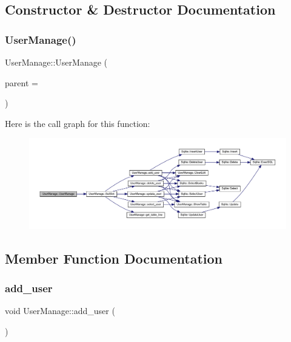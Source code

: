 \subsection{Constructor \& Destructor Documentation}
\mbox{\label{class_user_manage_ae341d2b1a3a87f0603a2788f37517c4a}} 
\subsubsection{\texorpdfstring{UserManage()}{UserManage()}}
{\footnotesize\ttfamily User\+Manage\+::\+User\+Manage (\begin{DoxyParamCaption}\item[{Q\+Widget $\ast$}]{parent = {} }\end{DoxyParamCaption})\hspace{0.3cm}{\ttfamily [explicit]}}

Here is the call graph for this function\+:
\nopagebreak
\begin{figure}[H]
\begin{center}
\leavevmode
\includegraphics[width=350pt]{class_user_manage_ae341d2b1a3a87f0603a2788f37517c4a_cgraph}
\end{center}
\end{figure}


\subsection{Member Function Documentation}
\mbox{\label{class_user_manage_a7058bbb981e4c6b3064c3e5e334ac700}} 
\subsubsection{\texorpdfstring{add\_user}{add\_user}}
{\footnotesize\ttfamily void User\+Manage\+::add\+\_\+user (\begin{DoxyParamCaption}{ }\end{DoxyParamCaption})\hspace{0.3cm}{\ttfamily [slot]}}

